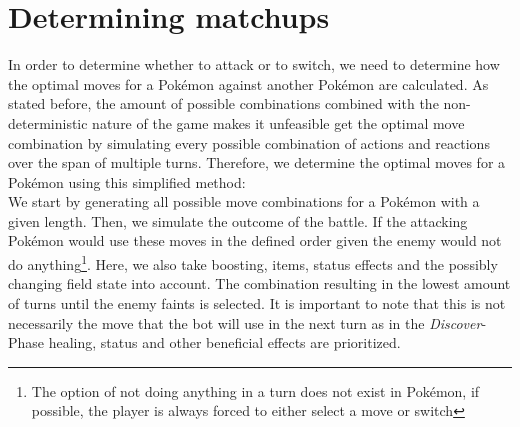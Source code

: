 \section{Determining matchups}
\label{sec:determine-matchups}
In order to determine whether to attack or to switch, we need to determine how the optimal moves for a Pokémon against
another Pokémon are calculated. As stated before, the amount of possible combinations combined with the non-deterministic
nature of the game makes it unfeasible get the optimal move combination by simulating every possible combination of 
actions and reactions over the span of multiple turns. Therefore, we determine the optimal moves for a Pokémon using 
this simplified method: \\
We start by generating all possible move combinations for a Pokémon with a given length. Then, we simulate the outcome
of the battle. If the attacking Pokémon would use these moves in the defined order given the enemy would not do 
anything\footnote{The option of not doing anything in a turn does not exist in Pokémon, if possible, the player is always 
forced to either select a move or switch}. Here, we also take boosting, items, status effects and the possibly changing
field state into account.
The combination resulting in the lowest amount of turns until the enemy faints is selected. 
It is important to note that this is not necessarily the move that the bot will use in the next turn as in the 
\textit{Discover}-Phase healing, status and other beneficial effects are prioritized.

